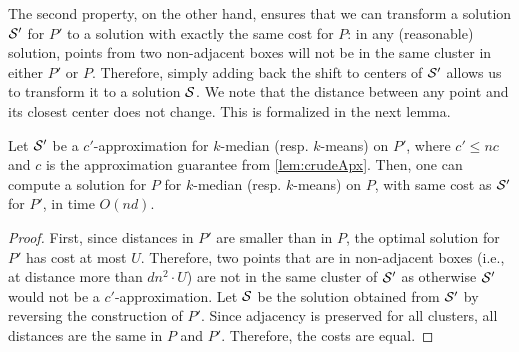 The second property, on the other hand, ensures that we can transform a solution $\mathcal S'$ for $P'$ to a solution with exactly the same cost for $P$: in any
(reasonable) solution, points from two non-adjacent boxes will not be in the same cluster in either $P'$ or $P$. Therefore, simply adding back the shift to
centers of $\mathcal S'$ allows us to transform it to a solution $\mathcal S$. We note that the distance between any point and its closest center does not change. This is
formalized in the next lemma.

\begin{lemma}
Let $\mathcal S'$ be a $c'$-approximation for  $k$-median (resp. $k$-means) on $P'$, where $c' \leq nc$ and $c$ is the approximation guarantee from
\cref{lem:crudeApx}. Then, one can compute a solution for $P$ for $k$-median (resp. $k$-means) on $P$, with same cost as $\mathcal S'$ for $P'$, in time $O(nd)$.
\end{lemma}
\begin{proof}

First, since distances in $P'$ are smaller than in $P$, the optimal solution for $P'$ has cost at most $U$. Therefore, two points that are in non-adjacent boxes
(i.e., at distance more than $d n^2\cdot U$) are not in the same cluster of $\mathcal S'$ as otherwise $\mathcal S'$ would not be a $c'$-approximation.  Let $\mathcal S$ be
the solution obtained from $\mathcal S'$ by reversing the construction of $P'$. Since adjacency is preserved for all clusters, all
distances are the same in $P$ and $P'$. Therefore, the costs are equal.
\end{proof}
